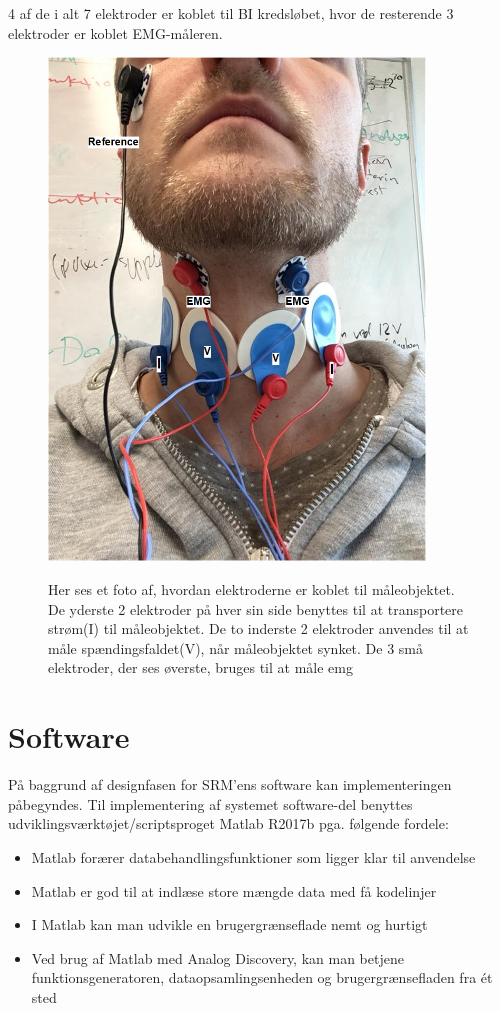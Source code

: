 4 af de i alt 7 elektroder er koblet til BI kredsløbet, hvor de resterende 3 elektroder er koblet EMG-måleren.   
\begin{figure}[H] 
\centering
{\includegraphics[width=10cm]
{Figure/maleobjektmedelektroder}}
\caption{Her ses et foto af, hvordan elektroderne er koblet til måleobjektet. De yderste 2 elektroder på hver sin side benyttes til at transportere strøm(I) til måleobjektet. De to inderste 2 elektroder anvendes til at måle spændingsfaldet(V), når måleobjektet synket. De 3 små elektroder, der ses øverste, bruges til at måle emg}
\label{fig:maaleobjekt}
\end{figure}

\pagebreak
\section{Software}

På baggrund af designfasen for SRM'ens software kan implementeringen påbegyndes. Til implementering  af systemet software-del benyttes  udviklingsværktøjet/scriptsproget  Matlab R2017b pga. følgende fordele:


\begin{itemize}
\item Matlab forærer databehandlingsfunktioner som ligger klar til anvendelse
\item Matlab er god til at indlæse store mængde data med få kodelinjer
\item I Matlab kan man udvikle en brugergrænseflade nemt og hurtigt 
\item Ved brug af Matlab med Analog Discovery, kan man betjene  funktionsgeneratoren, dataopsamlingsenheden og brugergrænsefladen  fra ét sted
\end{itemize}
   
